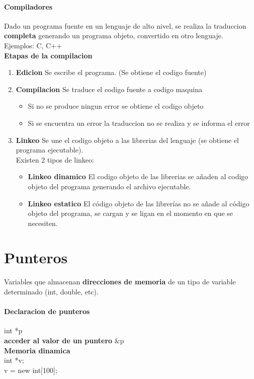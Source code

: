 \documentclass[11pt]{article}
\begin{document}
\paragraph{Compiladores} Dado un programa fuente en un lenguaje de alto nivel, se realiza la traduccion \textbf{completa} generando un programa objeto, convertido en otro lenguaje.\\
Ejemplos: C, C++\\
\textbf{Etapas de la compilacion}
\begin{enumerate}
	\item \textbf{Edicion} Se escribe el programa. (Se obtiene el codigo fuente)
	\item \textbf{Compilacion} Se traduce el codigo fuente a codigo maquina
	\begin{itemize}
		\item Si no se produce ningun error se obtiene el codigo objeto
		\item Si se encuentra un error la traduccion no se realiza y se informa el error
	\end{itemize}
	\item \textbf{Linkeo} Se une el codigo objeto a las librerias del lenguaje (se obtiene el programa ejecutable).\\
	Existen 2 tipos de linkeo:
	\begin{itemize}
		\item \textbf{Linkeo dinamico} El codigo objeto de las librerias se añaden al codigo objeto del programa generando el archivo ejecutable.
		\item \textbf{Linkeo estatico} El código objeto de las librerías no se añade al código objeto del programa, se cargan y se ligan en el momento en que se necesiten.
	\end{itemize}
\end{enumerate}
\section{Punteros} Variables que almacenan \textbf{direcciones de memoria} de un tipo de variable determinado (int, double, etc).
\paragraph{Declaracion de punteros} int *p\\
\textbf{acceder al valor de un puntero} \&p \\
\textbf{Memoria dinamica} \\
int *v;\\
v = new int[100];\\
\end{document}
